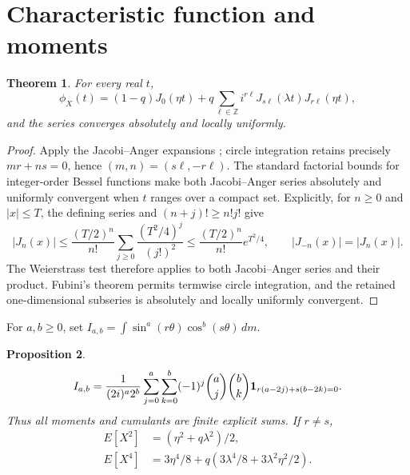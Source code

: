 \documentclass[11pt]{amsart}
\numberwithin{equation}{section}\setcounter{tocdepth}{3}\setcounter{secnumdepth}{3}
\newtheorem{theorem}{Theorem}[section]\newtheorem{proposition}[theorem]{Proposition}
\begin{document}
\section{Characteristic function and moments}\label{sec:characteristic}
\begin{theorem}\label{thm:cf}
For every real $t$,
\begin{equation}\phi_X(t)=(1-q)J_0(\eta t)+q\sum_{\ell\in\mathbb Z}
i^{r\ell}J_{s\ell}(\lambda t)J_{r\ell}(\eta t),\label{eq:cf}\end{equation}
and the series converges absolutely and locally uniformly.
\end{theorem}
\begin{proof}Apply the Jacobi--Anger expansions \cite{DLMF2026}; circle integration
retains precisely $mr+ns=0$, hence $(m,n)=(s\ell,-r\ell)$.  The standard factorial
bounds for integer-order Bessel functions make both Jacobi--Anger series absolutely and
uniformly convergent when $t$ ranges over a compact set.  Explicitly, for $n\ge0$ and
$|x|\le T$, the defining series and $(n+j)!\ge n!j!$ give
\begin{equation}
 |J_n(x)|\le \frac{(T/2)^n}{n!}
 \sum_{j\ge0}\frac{(T^2/4)^j}{(j!)^2}
 \le \frac{(T/2)^n}{n!}e^{T^2/4},
 \qquad |J_{-n}(x)|=|J_n(x)|.
 \label{eq:bessel_uniform_factorial_bound}
\end{equation}
The Weierstrass test therefore applies to both Jacobi--Anger series and their product.
Fubini's theorem permits termwise circle integration, and the retained one-dimensional
subseries is absolutely and locally uniformly convergent.
\end{proof}
For $a,b\ge0$, set $I_{a,b}=\int\sin^a(r\theta)\cos^b(s\theta)\,dm$.
\begin{proposition}\label{prop:resonance}
\begin{equation}I_{a,b}=\frac1{(2i)^a2^b}\sum_{j=0}^a\sum_{k=0}^b
(-1)^j\binom aj\binom bk{\bf1}_{r(a-2j)+s(b-2k)=0}.\label{eq:resonance}\end{equation}
Thus all moments and cumulants are finite explicit sums.  If $r\ne s$,
\begin{align}E[X^2]&=(\eta^2+q\lambda^2)/2,\label{eq:m2}\\
E[X^4]&=3\eta^4/8+q(3\lambda^4/8+3\lambda^2\eta^2/2).\label{eq:m4}
\end{align}
\end{proposition}
\end{document}
